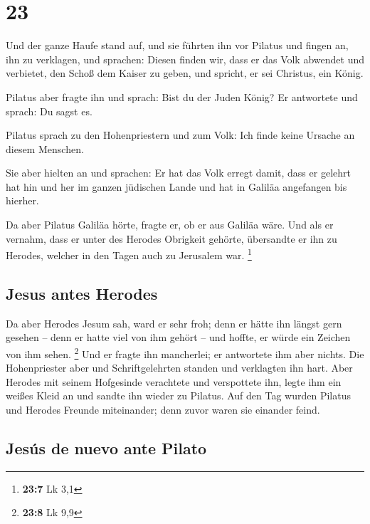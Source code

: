 \hypertarget{section-22}{%
\section{23}\label{section-22}}

 Und der ganze Haufe stand auf, und sie führten ihn vor
Pilatus  und fingen an, ihn zu verklagen, und sprachen:
Diesen finden wir, dass er das Volk abwendet und verbietet, den Schoß
dem Kaiser zu geben, und spricht, er sei Christus, ein König.

 Pilatus aber fragte ihn und sprach: Bist du der Juden
König? Er antwortete und sprach: Du sagst es.

 Pilatus sprach zu den Hohenpriestern und zum Volk: Ich
finde keine Ursache an diesem Menschen.

 Sie aber hielten an und sprachen: Er hat das Volk erregt
damit, dass er gelehrt hat hin und her im ganzen jüdischen Lande und hat
in Galiläa angefangen bis hierher.

 Da aber Pilatus Galiläa hörte, fragte er, ob er aus
Galiläa wäre.  Und als er vernahm, dass er unter des
Herodes Obrigkeit gehörte, übersandte er ihn zu Herodes, welcher in den
Tagen auch zu Jerusalem war. \footnote{\textbf{23:7} Lk 3,1}

\hypertarget{jesus-antes-herodes}{%
\subsection{Jesus antes Herodes}\label{jesus-antes-herodes}}

 Da aber Herodes Jesum sah, ward er sehr froh; denn er
hätte ihn längst gern gesehen -- denn er hatte viel von ihm gehört --
und hoffte, er würde ein Zeichen von ihm sehen. \footnote{\textbf{23:8}
  Lk 9,9}  Und er fragte ihn mancherlei; er antwortete ihm
aber nichts.  Die Hohenpriester aber und Schriftgelehrten
standen und verklagten ihn hart.  Aber Herodes mit seinem
Hofgesinde verachtete und verspottete ihn, legte ihm ein weißes Kleid an
und sandte ihn wieder zu Pilatus.  Auf den Tag wurden
Pilatus und Herodes Freunde miteinander; denn zuvor waren sie einander
feind.

\hypertarget{jesuxfas-de-nuevo-ante-pilato}{%
\subsection{Jesús de nuevo ante
Pilato}\label{jesuxfas-de-nuevo-ante-pilato}}


